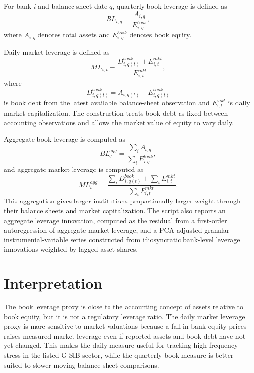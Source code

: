 \documentclass[11pt]{article}
\begin{document}
For bank \(i\) and balance-sheet date \(q\), quarterly book leverage is defined as
\begin{equation}
BL_{i,q} = \frac{A_{i,q}}{E^{book}_{i,q}},
\end{equation}
where \(A_{i,q}\) denotes total assets and \(E^{book}_{i,q}\) denotes book equity.

Daily market leverage is defined as
\begin{equation}
ML_{i,t} = \frac{D^{book}_{i,q(t)} + E^{mkt}_{i,t}}{E^{mkt}_{i,t}},
\end{equation}
where
\begin{equation}
D^{book}_{i,q(t)} = A_{i,q(t)} - E^{book}_{i,q(t)}
\end{equation}
is book debt from the latest available balance-sheet observation and \(E^{mkt}_{i,t}\) is daily market capitalization. The construction treats book debt as fixed between accounting observations and allows the market value of equity to vary daily.

Aggregate book leverage is computed as
\begin{equation}
BL^{agg}_{q} = \frac{\sum_i A_{i,q}}{\sum_i E^{book}_{i,q}},
\end{equation}
and aggregate market leverage is computed as
\begin{equation}
ML^{agg}_{t} =
\frac{\sum_i D^{book}_{i,q(t)} + \sum_i E^{mkt}_{i,t}}
{\sum_i E^{mkt}_{i,t}}.
\end{equation}
This aggregation gives larger institutions proportionally larger weight through their balance sheets and market capitalization. The script also reports an aggregate leverage innovation, computed as the residual from a first-order autoregression of aggregate market leverage, and a PCA-adjusted granular instrumental-variable series constructed from idiosyncratic bank-level leverage innovations weighted by lagged asset shares.

\section{Interpretation}

The book leverage proxy is close to the accounting concept of assets relative to book equity, but it is not a regulatory leverage ratio. The daily market leverage proxy is more sensitive to market valuations because a fall in bank equity prices raises measured market leverage even if reported assets and book debt have not yet changed. This makes the daily measure useful for tracking high-frequency stress in the listed G-SIB sector, while the quarterly book measure is better suited to slower-moving balance-sheet comparisons.
\end{document}
